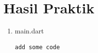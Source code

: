 \documentclass[a4paper, 12pt]{article}
\begin{document}






\newpage
\section{Hasil Praktik}
\begin{enumerate}
  \item main.dart
    \begin{lstlisting}[breaklines=true]
      add some code
    \end{lstlisting}
\end{enumerate}
\end{document}
